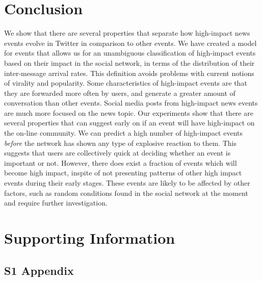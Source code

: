 \documentclass[10pt,letterpaper]{article}
\begin{document}
\section*{Conclusion}

We show that there are several properties that separate how
high-impact news events evolve in Twitter in comparison to other
events. We have created a model for events that allows us for an
unambiguous classification of high-impact events based on their impact
in the social network, in terms of the distribution of their
inter-message arrival rates. This definition avoids problems with
current notions of virality and popularity. Some characteristics of
high-impact events are that they are forwarded more often by users,
and generate a greater amount of conversation than other events.
Social media posts from high-impact news events are much more focused
on the news topic. Our experiments show that there are several
properties that can suggest early on if an event will have
high-impact on the on-line community. 
We can predict a high number of high-impact events {\em
  before} the network has shown any type of explosive reaction to
them. %
This suggests that users are collectively quick at deciding whether an event
is important or not.  However, there does exist a fraction of events
which will become high impact, inspite of not presenting patterns 
of other high impact events during their early stages.  These events
are likely to be affected by other factors, such as random conditions
found in the social network at the moment and require further investigation.

\section*{Supporting Information}
\subsection*{S1 Appendix}

\end{document}
